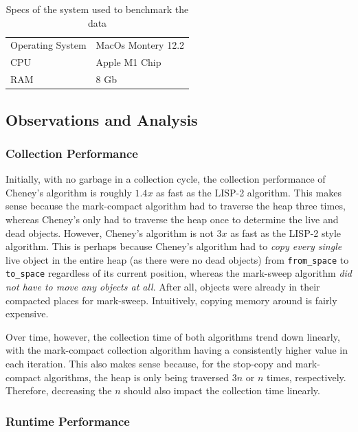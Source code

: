 \documentclass[index]{subfiles}
\begin{document}
\begin{table}
    \centering
    \begin{tabular}{@{}ll@{}} \toprule
        Operating System & MacOs Montery 12.2 \\
        CPU               & Apple M1 Chip      \\
        RAM               & 8 Gb\\
        \bottomrule
    \end{tabular}
    \caption{Specs of the system used to benchmark the data}
\end{table}

\subsection{Observations and Analysis}

\subsubsection{Collection Performance}

Initially, with no garbage in a collection cycle, the collection performance of Cheney's algorithm is roughly \(1.4x\) as fast as the LISP-2 algorithm. This makes sense because the mark-compact algorithm had to traverse the heap three times, whereas Cheney's only had to traverse the heap once to determine the live and dead objects. However, Cheney's algorithm is not \(3x\) as fast as the LISP-2 style algorithm. This is perhaps because Cheney's algorithm had to \textit{copy every single} live object in the entire heap (as there were no dead objects) from \verb+from_space+ to \verb+to_space+ regardless of its current position, whereas the mark-sweep algorithm \textit{did not have to move any objects at all}. After all, objects were already in their compacted places for mark-sweep. Intuitively, copying memory around is fairly expensive.

Over time, however, the collection time of both algorithms trend down linearly, with the mark-compact collection algorithm having a consistently higher value in each iteration. This also makes sense because, for the stop-copy and mark-compact algorithms, the heap is only being traversed \(3n\) or \(n\) times, respectively. Therefore, decreasing the \(n\) should also impact the collection time linearly.

\subsubsection{Runtime Performance}
\end{document}
